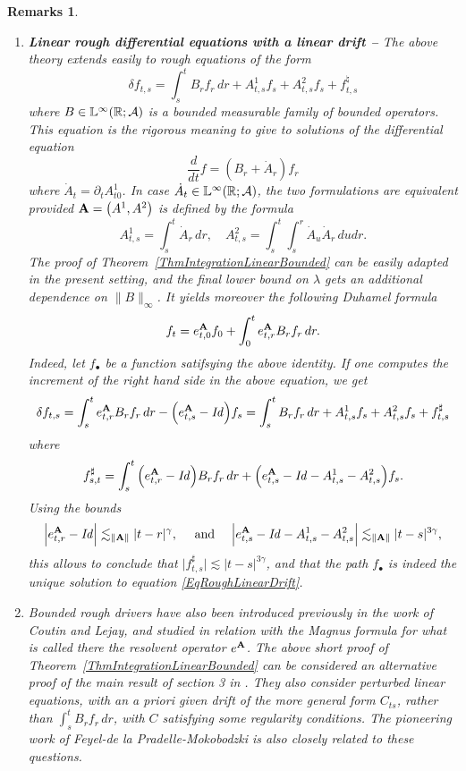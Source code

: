 \documentclass[11pt,a4paper]{amsart}
\newcommand{\RR}{\mathbb{R}}  \newcommand{\CC}{\mathbb{C}}  \newcommand{\LL}{\mathbb{L}}  \newcommand{\WW}{\mathbb{W}}
\newtheorem{rems}[thm]{{\sc Remarks}}
\numberwithin{equation}{section} %
\begin{document}
\begin{rems}
\begin{enumerate}
   \item {\bf Linear rough differential equations with a linear drift -- } The above theory extends easily to rough equations of the form
\begin{equation}
\label{EqRoughLinearDrift}
\delta f_{t, s} = \int_s^t B_r f_r\,dr + A^1_{t, s} f_s + A^2_{t, s} f_s + f^{\natural}_{t, s}
\end{equation}
where $B \in \LL^{\infty} (\RR; \mcA)$ is a bounded measurable family of bounded operators. This equation is the rigorous meaning to give to solutions of the differential equation
$$
\frac{d}{dt} f = (B_r + \dot{A}_r) f_r
$$
where $\dot{A}_t = \partial_t A_{t0}^1$. In case $\dot{A}_t \in \LL^{\infty} (\RR; \mcA)$, the two formulations are equivalent provided ${\bf A} = \big(A^1, A^2\big)$ is defined by the formula
$$ 
A^1_{t, s} = \int_s^t \dot{A}_r \,dr, \quad A^2_{t, s} = \int_s^t \int_s^r \dot{A}_u \dot{A}_r \,du dr.
$$
The proof of Theorem~\ref{ThmIntegrationLinearBounded} can be easily adapted in the present setting, and the final lower bound on $\lambda$ gets an additional dependence on $\| B \|_\infty$. It yields moreover the following Duhamel formula
$$
f_t = e^{\bf A}_{t, 0} f_0 + \int_0^t e^{\bf A}_{t, r} B_r f_r\,dr.
$$
Indeed, let $f_\bullet$ be a function satifsying the above identity. If one computes the increment of the right hand side in the above equation, we get
$$
\delta f_{t, s} = \int_s^t e^{\bf A}_{t, r} B_r f_r \,dr - \Big(e^{\bf A}_{t, s} -\textrm{\emph{Id}}\Big) f_s = \int_s^t B_r f_r \,dr + A^1_{t, s} f_s + A^2_{t, s} f_s + f^\sharp_{t, s}
$$
where
$$
f^\sharp_{s, t} = \int_s^t \Big(e^{\bf A}_{t, r} -\textrm{\emph{Id}}\Big) B_r f_r \,dr + \Big(e^{\bf A}_{t, s} -\textrm{\emph{Id}} - A^1_{t, s} - A^2_{t, s}\Big) f_s.
$$
Using the bounds
$$
\Big| e^{\bf A}_{t, r} -\textrm{\emph{Id}}\Big| \lesssim_{\|{\bf A}\|} | t -  r |^{\gamma}, \quad \textrm{ and }\quad  \Big| e^{\bf A}_{t, s}  -\textrm{\emph{Id}} - A^1_{t, s} - A^2_{t, s} \Big| \lesssim_{\| {\bf A} \|} | t - s |^{3 \gamma},
$$
this allows to conclude that $\big|f^{\sharp}_{t, s}\big| \lesssim | t - s |^{3\gamma}$, and that the path $f_\bullet$ is indeed the unique solution to equation \eqref{EqRoughLinearDrift}. \vspace{0.2cm}

   \item Bounded rough drivers have also been introduced previously in the work \cite{CoutinLejayLinear} of Coutin and Lejay, and studied in relation with the Magnus formula for what is called there the \emph{resolvent operator} $e^{\bf A}$. The above short proof of Theorem~\ref{ThmIntegrationLinearBounded} can be considered an alternative proof of the main result of section 3 in \cite{CoutinLejayLinear}. They also consider perturbed linear equations, with an a priori given drift of the more general form $C_{ts}$, rather than $\int_s^t B_rf_r\,dr$, with $C$ satisfying some regularity conditions. The pioneering work \cite{FdlPM} of Feyel-de la Pradelle-Mokobodzki is also closely related to these questions.
\end{enumerate}
\end{rems}
\end{document}
